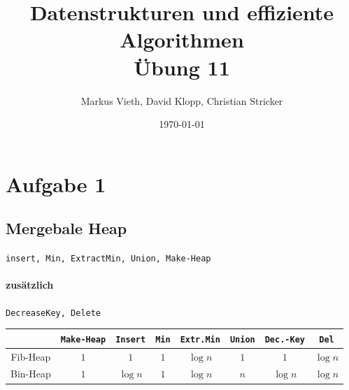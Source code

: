 \documentclass[a4paper,11pt,twoside]{scrartcl}
\title{Datenstrukturen und effiziente Algorithmen\\ Übung 11}
\author{Markus Vieth, David Klopp, Christian Stricker}
\date{\today}
\begin{document}
\maketitle
\cleardoublepage
\pagestyle{myheadings}


\section*{Aufgabe 1}
\subsection{Mergebale Heap}
\texttt{insert, Min, ExtractMin, Union, Make-Heap}
\paragraph{zusätzlich} \texttt{DecreaseKey, Delete}\\
\begin{tabular}{c|c|c|c|c|c|c|c}
	 &\texttt{Make-Heap}&\texttt{Insert}&\texttt{Min}&\texttt{Extr.Min}&\texttt{Union}&\texttt{Dec.-Key}&\texttt{Del} \\ \hline
	 Fib-Heap&$1$&$1$&$1$&$\log n$&$1$&$1$&$\log n$ \\ \hline
	 Bin-Heap&$1$&$\log n$&$1$&$\log n$&$n$&$\log n$&$\log n$ 
\end{tabular}
\end{document}
